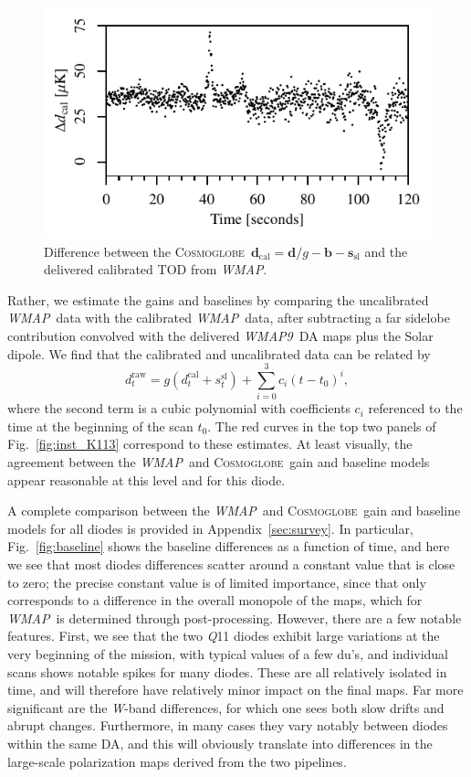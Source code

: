 \documentclass[twocolumn]{../../common/aa}
\def\WMAP{\emph{WMAP}}
\def\WMAPnine{\emph{WMAP9}}
\newcommand{\cosmoglobe}{\textsc{Cosmoglobe}}
\newcommand{\Q}[0]{\textit Q}
\newcommand{\W}[0]{\textit W}
\begin{document}
\begin{figure}
	\includegraphics[width=\columnwidth]{figures/K113_TOD_diff_10min.pdf}
	\caption{Difference between the \cosmoglobe\ $\boldsymbol d_\mathrm{cal}=\boldsymbol d/g-\boldsymbol b - \boldsymbol s_\mathrm{sl}$ and the delivered calibrated TOD from \WMAP.}
	\label{fig:cal_comp_10min}
\end{figure}


Rather, we estimate the gains and baselines by comparing the uncalibrated \WMAP\ data with the calibrated \WMAP\ data, after subtracting a far sidelobe contribution convolved with the delivered \WMAPnine\ DA maps plus the Solar dipole.  We find that the calibrated and uncalibrated data can be related by
\begin{equation}
	d^\mathrm{raw}_t=g(d^\mathrm{cal}_t+s^\mathrm{sl}_t)+\sum_{i=0}^3c_i(t-t_0)^i,
\end{equation}
where the second term is a cubic polynomial with coefficients $c_i$ referenced to the time at the beginning of the scan $t_0$. The red curves in the top two panels of Fig.~\ref{fig:inst_K113} correspond to these estimates. At least visually, the agreement between the \WMAP\ and \cosmoglobe\ gain and baseline models appear reasonable at this level and for this diode.

A complete comparison between the  \WMAP\ and \cosmoglobe\ gain and baseline models for all diodes is provided in Appendix~\ref{sec:survey}. In particular, Fig.~\ref{fig:baseline} shows the baseline differences as a function of time, and here we see that most diodes differences scatter around a constant value that is close to zero; the precise constant value is of limited importance, since that only corresponds to a difference in the overall monopole of the maps, which for \WMAP\ is determined through post-processing. However, there are a few notable features. First, we see that the two \Q11 diodes exhibit large variations at the very beginning of the mission, with typical values of a few du's, and individual scans shows notable spikes for many diodes. These are all relatively isolated in time, and will therefore have relatively minor impact on the final maps. Far more significant are the \W-band differences, for which one sees both slow drifts and abrupt changes. Furthermore, in many cases they vary notably between diodes within the same DA, and this will obviously translate into differences in the large-scale polarization maps derived from the two pipelines.
\end{document}
